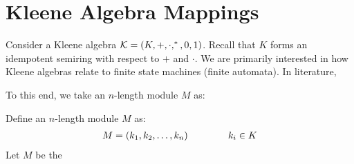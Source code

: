 \section{Kleene Algebra Mappings}
Consider a Kleene algebra
\(\mathcal{K} = \left(K, +, \cdot, ^\ast, 0, 1\right)\).
Recall that \(K\) forms an idempotent semiring with respect to
\(+\) and \(\cdot\).
We are primarily interested in how
Kleene algebras relate to finite state machines (finite automata).
In literature, 

To this end,
we take an \(n\)-length module \(M\) as:



Define an \(n\)-length module \(M\) as:
\begin{align*}
  M = \left(k_1, k_2, \ldots, k_n\right)
  \qquad
  \qquad
  k_i \in K
\end{align*}
Let \(M\) be the 





